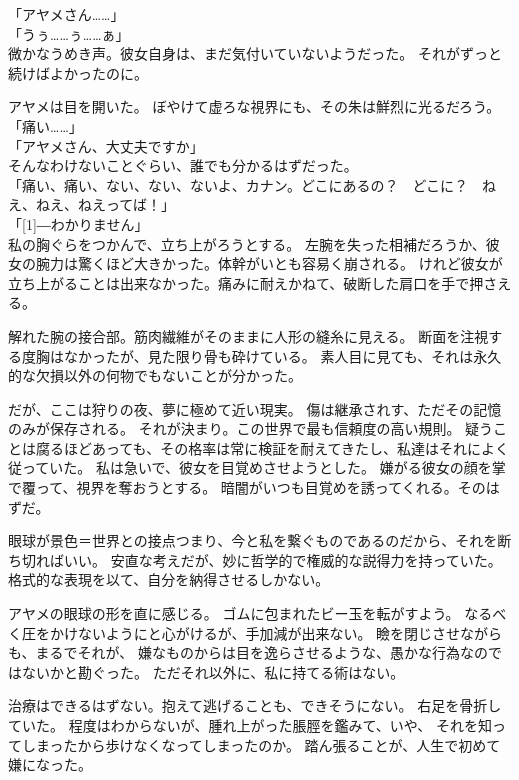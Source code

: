 \documentclass[../IHMain]{subfiles}
\begin{document}
「アヤメさん……」\\
「うぅ……ぅ……ぁ」\\
微かなうめき声。彼女自身は、まだ気付いていないようだった。
それがずっと続けばよかったのに。

アヤメは目を開いた。
ぼやけて虚ろな視界にも、その朱は鮮烈に光るだろう。\\
「痛い……」\\
「アヤメさん、大丈夫ですか」\\
そんなわけないことぐらい、誰でも分かるはずだった。\\
「痛い、痛い、ない、ない、ないよ、カナン。どこにあるの？　どこに？　ねえ、ねえ、ねえってば！」\\
「\scalebox{3}[1]{―}わかりません」\\
私の胸ぐらをつかんで、立ち上がろうとする。
左腕を失った相補だろうか、彼女の腕力は驚くほど大きかった。体幹がいとも容易く崩される。
けれど彼女が立ち上がることは出来なかった。痛みに耐えかねて、破断した肩口を手で押さえる。

解れた腕の接合部。筋肉繊維がそのままに人形の縫糸に見える。
断面を注視する度胸はなかったが、見た限り骨も砕けている。
素人目に見ても、それは永久的な欠損以外の何物でもないことが分かった。

だが、ここは狩りの夜、夢に極めて近い現実。
傷は継承されす、ただその記憶のみが保存される。
それが決まり。この世界で最も信頼度の高い規則。
疑うことは腐るほどあっても、その格率は常に検証を耐えてきたし、私達はそれによく従っていた。
私は急いで、彼女を目覚めさせようとした。
嫌がる彼女の顔を掌で覆って、視界を奪おうとする。
暗闇がいつも目覚めを誘ってくれる。そのはずだ。

眼球が景色＝世界との接点つまり、今と私を繋ぐものであるのだから、それを断ち切ればいい。
安直な考えだが、妙に哲学的で権威的な説得力を持っていた。
格式的な表現を以て、自分を納得させるしかない。

アヤメの眼球の形を直に感じる。
ゴムに包まれたビー玉を転がすよう。
なるべく圧をかけないようにと心がけるが、手加減が出来ない。
瞼を閉じさせながらも、まるでそれが、
嫌なものからは目を逸らさせるような、愚かな行為なのではないかと勘ぐった。
ただそれ以外に、私に持てる術はない。

治療はできるはずない。抱えて逃げることも、できそうにない。
右足を骨折していた。
程度はわからないが、腫れ上がった脹脛を鑑みて、いや、
それを知ってしまったから歩けなくなってしまったのか。
踏ん張ることが、人生で初めて嫌になった。
\end{document}
